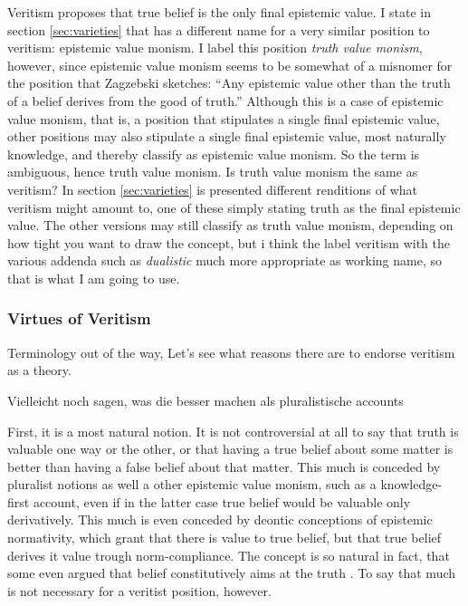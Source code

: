 \documentclass[12pt,numbers=noenddot]{scrartcl}
\begin{document}
Veritism proposes that true belief is the only final epistemic value. I state in section \ref{sec:varieties} that \textcite[191]{Zagzebski2004-ZAGEVM-2} has a different name for a very similar position to veritism: epistemic value monism. I label this position \emph{truth value monism}, however, since epistemic value monism seems to be somewhat of a misnomer for the position that Zagzebski sketches: “Any epistemic value other than the truth of a belief derives from the good of truth.” Although this is a case of epistemic value monism, that is, a position that stipulates a single final epistemic value, other positions may also stipulate a single final epistemic value, most naturally knowledge, and thereby classify as epistemic value monism. So the term is ambiguous, hence truth value monism.
Is truth value monism the same as veritism? In section \ref{sec:varieties} is presented different renditions of what veritism might amount to, one of these simply stating truth as the final epistemic value. The other versions may still classify as truth value monism, depending on how tight you want to draw the concept, but i think the label veritism with the various addenda such as \emph{dualistic} much more appropriate as working name, so that is what I am going to use.

\subsubsection { Virtues of Veritism }
Terminology out of the way, Let's see what reasons there are to endorse veritism as a theory.

Vielleicht noch sagen, was die besser machen als pluralistische accounts

First, it is a most natural notion. It is not controversial at all to say that truth is valuable one way or the other, or that having a true belief about some matter is better than having a false belief about that matter. This much is conceded by pluralist notions as well a other epistemic value monism, such as a knowledge-first account, even if in the latter case true belief would be valuable only derivatively. This much is even conceded by deontic conceptions of epistemic normativity, which grant that there is value to true belief, but that true belief derives it value trough norm-compliance. The concept is so natural in fact, that some even argued that belief constitutively aims at the truth \autocite{Shah2003-SHAHTG,Velleman2000-VELOTA}. To say that much is not necessary for a veritist position, however.
\end{document}
